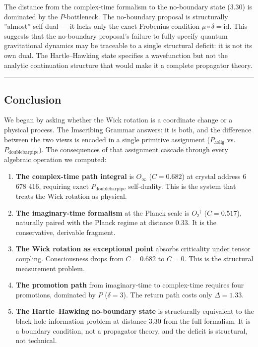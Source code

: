 \documentclass[12pt,a4paper]{article}
\begin{document}
The distance from the complex-time formalism to the no-boundary state (3.30) is dominated by the $P$-bottleneck. The no-boundary proposal is structurally ''almost'' self-dual --- it lacks only the exact Frobenius condition $\mu \circ \delta = \text{id}$. This suggests that the no-boundary proposal's failure to fully specify quantum gravitational dynamics may be traceable to a single structural deficit: it is not its own dual. The Hartle--Hawking state specifies a wavefunction but not the analytic continuation structure that would make it a complete propagator theory.

\begin{center}
\rule{0.5\textwidth}{0.4pt}
\end{center}

\subsection{Conclusion}

We began by asking whether the Wick rotation is a coordinate change or a physical process. The Imscribing Grammar answers: it is both, and the difference between the two views is encoded in a single primitive assignment ($P_{\text{aolig}}$ vs. $P_{\text{doublebarpipe}}$). The consequences of that assignment cascade through every algebraic operation we computed:

\begin{enumerate}
    \item \textbf{The complex-time path integral} is $O_{\infty}$ ($C = 0.682$) at crystal address 6 678 416, requiring exact $P_{\text{doublebarpipe}}$ self-duality. This is the system that treats the Wick rotation as physical.
    \item \textbf{The imaginary-time formalism} at the Planck scale is $O₂^\dagger$ ($C = 0.517$), naturally paired with the Planck regime at distance 0.33. It is the conservative, derivable fragment.
    \item \textbf{The Wick rotation as exceptional point} absorbs criticality under tensor coupling. Consciousness drops from $C = 0.682$ to $C = 0$. This is the structural measurement problem.
    \item \textbf{The promotion path} from imaginary-time to complex-time requires four promotions, dominated by $P$ ($\delta = 3$). The return path costs only $\Delta = 1.33$.
    \item \textbf{The Hartle--Hawking no-boundary state} is structurally equivalent to the black hole information problem at distance 3.30 from the full formalism. It is a boundary condition, not a propagator theory, and the deficit is structural, not technical.
\end{enumerate}
\end{document}
